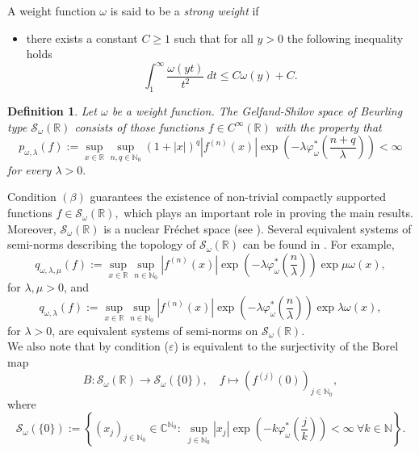 \documentclass[12pt,reqno]{amsart} %
\newtheorem{definition}[theorem]{Definition}
\numberwithin{equation}{section}
\begin{document}
A weight function  $\omega$ is said to be a {\it strong weight} if
\begin{itemize}
	\item[$(\varepsilon)$]
	there exists a constant $C \geq 1$ such that for all $y > 0$ the following inequality holds
	\begin{equation}
		\int_1^\infty \frac{\omega(yt)}{t^2}\ dt \leq C\omega(y) + C.
	\end{equation}
\end{itemize}

\begin{definition} Let $\omega$ be a weight function. The Gelfand-Shilov space of Beurling type $\mathcal{S}_{\omega}(\mathbb{R})$ consists of those functions $f\in C^\infty({\mathbb R})$ with the property that
	$$
	p_{\omega, \lambda}(f):= \sup_{x\in {\mathbb R}}\sup_{n,q\in {\mathbb N}_0}\left(1+|x|\right)^q|f^{(n)}(x)|\exp\left(-\lambda\varphi_\omega^\ast\left(\frac{n+q}{\lambda}\right)\right) < \infty
	$$ 
	for every $\lambda > 0.$
\end{definition}
\par\medskip 

Condition $(\beta)$ guarantees the existence of non-trivial compactly supported functions $f\in \mathcal{S}_{\omega}(\mathbb{R}),$ which plays an important role in proving the main results. Moreover,  $\mathcal{S}_{\omega}(\mathbb{R})$ is a nuclear Fr\'echet space (see \cite{nuclear}). Several equivalent systems of semi-norms describing the topology of $\mathcal{S}_{\omega}(\mathbb{R})$ can be found in \cite{asensio_jornet,seminormas}. For example, 
\[
q_{\omega,\lambda,\mu}(f):=\sup_{x\in {\mathbb R}}\sup_{n\in {\mathbb N}_0}|f^{(n)}(x)|\exp\left(-\lambda\varphi_\omega^\ast\left(\frac{n}{\lambda}\right)\right) \exp\mu\omega(x), 
\]
for $\lambda, \mu > 0$, 
and
\[
q_{\omega,\lambda}(f):=\sup_{x\in {\mathbb R}}\sup_{n\in {\mathbb N}_0}|f^{(n)}(x)|\exp\left(-\lambda\varphi_\omega^\ast\left(\frac{n}{\lambda}\right)\right) \exp\lambda\omega(x), 
\]
for $\lambda>0$, are  equivalent systems of semi-norms on $\mathcal{S}_{\omega}(\mathbb{R})$.\\



We also note that by \cite{mt} condition ($\varepsilon$) is equivalent to the surjectivity of the Borel map
$$
B\colon {\mathcal S}_\omega({\mathbb R})\to {\mathcal S}_\omega(\{0\}),\quad f\mapsto (f^{(j)}(0))_{j\in \mathbb{N}_0},
$$
where
$$
{\mathcal S}_\omega(\{0\}):=\left\{(x_j)_{j\in \mathbb{N}_0}\in \mathbb{C}^{\mathbb{N}_0}:\ \sup_{j\in\mathbb{N}_0}|x_j|\exp\left(-k\varphi^*_\omega\left(\frac{j}{k}\right)\right)<\infty\ \forall k\in\mathbb{N}\right\}.
$$
\end{document}
